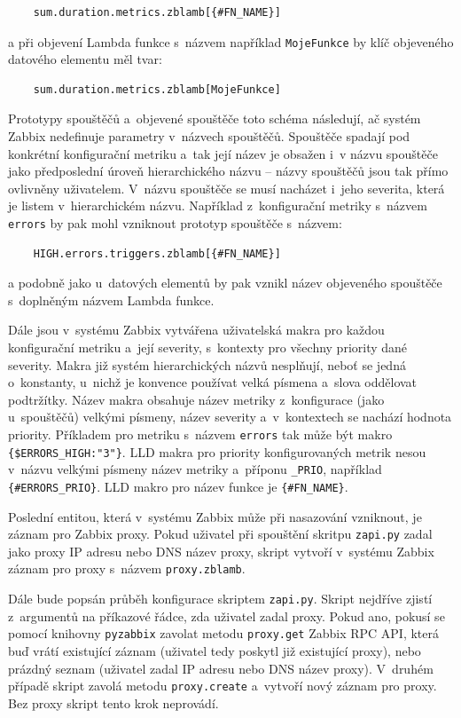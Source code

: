 \documentclass[czech, ing, kiv, he, iso690]{fasthesis}
\begin{document}
\begin{verbatim}
    sum.duration.metrics.zblamb[{#FN_NAME}]
\end{verbatim}

a při objevení Lambda funkce s~názvem například \verb|MojeFunkce| by klíč objeveného datového elementu měl tvar:

\begin{verbatim}
    sum.duration.metrics.zblamb[MojeFunkce]
\end{verbatim}

Prototypy spouštěčů a~objevené spouštěče toto schéma následují, ač systém Zabbix nedefinuje parametry v~názvech spouštěčů. Spouštěče spadají pod konkrétní konfigurační metriku a~tak její název je obsažen i~v názvu spouštěče jako předposlední úroveň hierarchického názvu -- názvy spouštěčů jsou tak přímo ovlivněny uživatelem. V~názvu spouštěče se musí nacházet i~jeho severita, která je listem v~hierarchickém názvu. Například z~konfigurační metriky s~názvem \verb|errors| by pak mohl vzniknout prototyp spouštěče s~názvem:

\begin{verbatim}
    HIGH.errors.triggers.zblamb[{#FN_NAME}]
\end{verbatim}

a podobně jako u~datových elementů by pak vznikl název objeveného spouštěče s~doplněným názvem Lambda funkce.

Dále jsou v~systému Zabbix vytvářena uživatelská makra pro každou konfigurační metriku a~její severity, s~kontexty pro všechny priority dané severity. Makra již systém hierarchických názvů nesplňují, neboť se jedná o~konstanty, u~nichž je konvence používat velká písmena a~slova oddělovat podtržítky. Název makra obsahuje název metriky z~konfigurace (jako u~spouštěčů) velkými písmeny, název severity a~v~kontextech se nachází hodnota priority. Příkladem pro metriku s~názvem \verb|errors| tak může být makro \verb|{$ERRORS_HIGH:"3"}|. LLD makra pro priority konfigurovaných metrik nesou v~názvu velkými písmeny název metriky a~příponu \verb|_PRIO|, například \verb|{#ERRORS_PRIO}|. LLD makro pro název funkce je \verb|{#FN_NAME}|.

Poslední entitou, která v~systému Zabbix může při nasazování vzniknout, je záznam pro Zabbix proxy. Pokud uživatel při spouštění skritpu \verb|zapi.py| zadal jako proxy IP adresu nebo DNS název proxy, skript vytvoří v~systému Zabbix záznam pro proxy s~názvem \verb|proxy.zblamb|. 

Dále bude popsán průběh konfigurace skriptem \verb|zapi.py|. Skript nejdříve zjistí z~argumentů na příkazové řádce, zda uživatel zadal proxy. Pokud ano, pokusí se pomocí knihovny \verb|pyzabbix| zavolat metodu \verb|proxy.get| Zabbix RPC API, která buď vrátí existující záznam (uživatel tedy poskytl již existující proxy), nebo prázdný seznam (uživatel zadal IP adresu nebo DNS název proxy). V~druhém případě skript zavolá metodu \verb|proxy.create| a~vytvoří nový záznam pro proxy. Bez proxy skript tento krok neprovádí.
\end{document}
